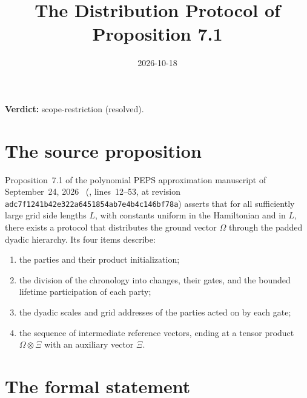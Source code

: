 \documentclass{article}
\title{The Distribution Protocol of Proposition 7.1}
\author{}
\date{2026-10-18}
\providecommand{\gapnote}[2]{%
    \par\noindent\textbf{Verdict:} #1 (#2).\par}
\begin{document}
\maketitle
\gapnote{scope-restriction}{resolved}

\section{The source proposition}

Proposition~7.1 of the polynomial PEPS approximation manuscript of
September~24, 2026~\cite{OpenAI2026PolynomialPEPS} (,
lines~12--53, at revision \texttt{adc7f1241b42e322a6451854ab7e4b4c146bf78a})
asserts that for all sufficiently large grid side lengths $L$, with constants
uniform in the Hamiltonian and in $L$, there exists a protocol that distributes
the ground vector $\Omega$ through the padded dyadic hierarchy. Its four items
describe:
\begin{enumerate}
    \item the parties and their product initialization;
    \item the division of the chronology into changes, their gates, and the bounded
          lifetime participation of each party;
    \item the dyadic scales and grid addresses of the parties acted on by each
          gate;
    \item the sequence of intermediate reference vectors, ending at a tensor
          product $\Omega \otimes \Xi$ with an auxiliary vector $\Xi$.
\end{enumerate}

\section{The formal statement}
\end{document}
